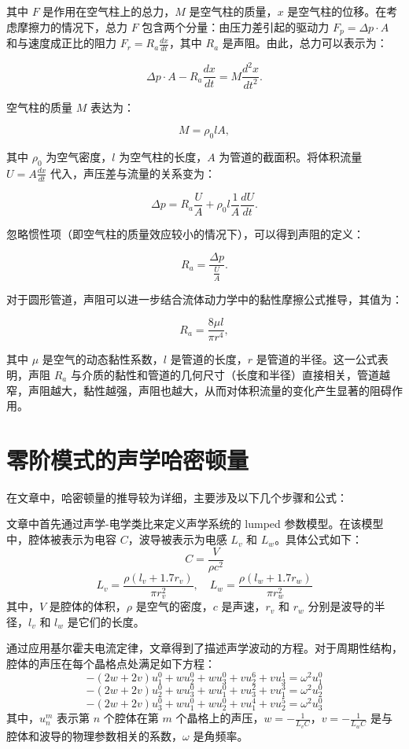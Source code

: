 其中 \( F \) 是作用在空气柱上的总力，\( M \) 是空气柱的质量，\( x \) 是空气柱的位移。在考虑摩擦力的情况下，总力 \( F \) 包含两个分量：由压力差引起的驱动力 \( F_p = \Delta p \cdot A \) 和与速度成正比的阻力 \( F_r = R_a \frac{dx}{dt} \)，其中 \( R_a \) 是声阻。由此，总力可以表示为：

\[
\Delta p \cdot A - R_a \frac{dx}{dt} = M \frac{d^2 x}{dt^2}.
\]

空气柱的质量 \( M \) 表达为：

\[
M = \rho_0 l A,
\]

其中 \( \rho_0 \) 为空气密度，\( l \) 为空气柱的长度，\( A \) 为管道的截面积。将体积流量 \( U = A \frac{dx}{dt} \) 代入，声压差与流量的关系变为：

\[
\Delta p = R_a \frac{U}{A} + \rho_0 l \frac{1}{A} \frac{dU}{dt}.
\]

忽略惯性项（即空气柱的质量效应较小的情况下），可以得到声阻的定义：

\[
R_a = \frac{\Delta p}{\frac{U}{A}}.
\]

对于圆形管道，声阻可以进一步结合流体动力学中的黏性摩擦公式推导，其值为：

\[
R_a = \frac{8 \mu l}{\pi r^4},
\]

其中 \( \mu \) 是空气的动态黏性系数，\( l \) 是管道的长度，\( r \) 是管道的半径。这一公式表明，声阻 \( R_a \) 与介质的黏性和管道的几何尺寸（长度和半径）直接相关，管道越窄，声阻越大，黏性越强，声阻也越大，从而对体积流量的变化产生显著的阻碍作用。

\section{零阶模式的声学哈密顿量}

在文章中，哈密顿量的推导较为详细，主要涉及以下几个步骤和公式：

文章中首先通过声学-电学类比来定义声学系统的 lumped 参数模型。在该模型中，腔体被表示为电容 \( C \)，波导被表示为电感 \( L_v \) 和 \( L_w \)。具体公式如下：
\[
C = \frac{V}{\rho c^2}
\]
\[
L_v = \frac{\rho (l_v + 1.7r_v)}{\pi r_v^2}, \quad L_w = \frac{\rho (l_w + 1.7r_w)}{\pi r_w^2}
\]
其中，\( V \) 是腔体的体积，\( \rho \) 是空气的密度，\( c \) 是声速，\( r_v \) 和 \( r_w \) 分别是波导的半径，\( l_v \) 和 \( l_w \) 是它们的长度。


通过应用基尔霍夫电流定律，文章得到了描述声学波动的方程。对于周期性结构，腔体的声压在每个晶格点处满足如下方程：
\[
- (2w + 2v) u_1^0 + w u_2^0 + w u_3^0 + v u_2^6 + v u_3^1 = \omega^2 u_1^0
\]
\[
- (2w + 2v) u_2^0 + w u_3^0 + w u_1^0 + v u_3^2 + v u_1^3 = \omega^2 u_2^0
\]
\[
- (2w + 2v) u_3^0 + w u_1^0 + w u_2^0 + v u_1^4 + v u_2^5 = \omega^2 u_3^0
\]
其中，\( u_n^m \) 表示第 \( n \) 个腔体在第 \( m \) 个晶格上的声压，\( w = -\frac{1}{L_v C} \)，\( v = -\frac{1}{L_w C} \) 是与腔体和波导的物理参数相关的系数，\( \omega \) 是角频率。


